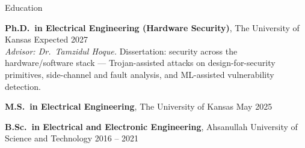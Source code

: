 \begin{rSection}{Education}

{\bf Ph.D.\ in Electrical Engineering (Hardware Security)}, The University of Kansas \hfill {Expected 2027}\\
\emph{Advisor: Dr.\ Tamzidul Hoque.} Dissertation: security across the hardware/software stack --- Trojan-assisted attacks on design-for-security primitives, side-channel and fault analysis, and ML-assisted vulnerability detection.

{\bf M.S.\ in Electrical Engineering}, The University of Kansas \hfill {May 2025}

{\bf B.Sc.\ in Electrical and Electronic Engineering}, Ahsanullah University of Science and Technology \hfill {2016 -- 2021}

\end{rSection}
